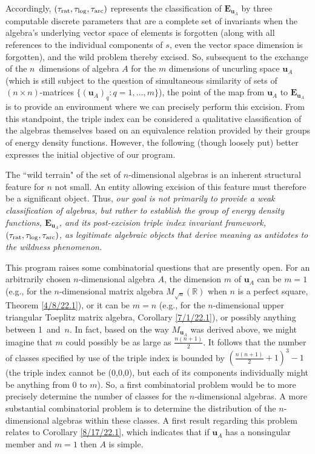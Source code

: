 \documentclass{amsart}
\numberwithin{equation}{section}
\theoremstyle{definition}
\numberwithin{theorem}{section}
\begin{document}
 Accordingly,  $(\tau_{\rm rat},\tau_{\rm log},\tau_{\rm arc})$ represents the classification of $\mathbf{E}_{\mathbf{u}_A}$ by three computable discrete parameters that are a complete set of invariants when the algebra's underlying vector space of elements is forgotten (along with all references to the individual components of $s$, even the vector space dimension is forgotten), and the wild problem thereby excised.  So, subsequent to the exchange of the \mbox{$n$ dimensions} of algebra $A$ for the $m$ dimensions of uncurling space $\mathbf{u}_A$ (which is still subject to the question of simultaneous similarity of sets of $(n\times n)$-matrices  $\{ (\mathbf{u}_A)_q:q=1,\dots,m\}$), the point of the map from $\mathbf{u}_A$ to $\mathbf{E}_{\mathbf{u}_A}$ is to provide an environment where we can precisely perform this excision.
  From this standpoint, the triple index can be considered a qualitative classification of the algebras themselves based on an equivalence relation provided by their groups of energy density functions.  
      However, the following (though loosely put)  better expresses the initial objective of our program.
 
 The ``wild terrain" of the set of $n$-dimensional algebras is an inherent structural feature for $n$ not small.  An entity allowing excision of this feature must therefore be a significant object.  Thus, {\it our goal is not primarily to provide a weak classification of algebras, but rather to establish the group of energy density functions, $\mathbf{E}_{\mathbf{u}_A}$, and its post-excision triple index invariant framework, $(\tau_{\rm rat},\tau_{\rm log},\tau_{\rm arc})$, as legitimate algebraic objects that derive meaning as antidotes to the wildness phenomenon.}


This program  raises some combinatorial questions that are presently open.  For an arbitrarily chosen \mbox{$n$-dimensional} algebra $A$, the dimension $m$ of $\mathbf{u}_A$ can be $m=1$ (e.g., for the $n$-dimensional matrix algebra $M_{\sqrt{n}}(\mathbb{R})$ when $n$ is a perfect square, Theorem \ref{4/8/22.1}), or it can be  $m=n$ (e.g., for the $n$-dimensional upper triangular Toeplitz matrix algebra, Corollary \ref{7/1/22.1}), or possibly anything between \mbox{1 and $n$}.  In fact, based on the way $M_{\mathbf{u}_A}$ was derived above, we might imagine that $m$ could possibly be as large as $\frac{n(n+1)}{2}$.  It follows that the number of classes specified by use of the triple index is bounded by $(\frac{n(n+1)}{2}+1)^3-1$ (the triple index cannot be (0,0,0), but each of its components individually might be anything from $0$ to $m$).  So, a first combinatorial problem would be to more precisely determine the number of classes for the $n$-dimensional algebras.    A more substantial combinatorial problem is to determine the distribution of the $n$-dimensional algebras within these classes.  A first result regarding this problem relates to Corollary \ref{8/17/22.1}, which indicates that if $\mathbf{u}_A$ has a nonsingular member and $m=1$ then $A$ is simple.   
  
\end{document}
